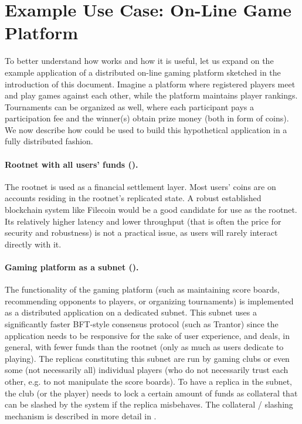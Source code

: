 \section{Example Use Case: On-Line Game Platform}
\label{sec:example-use-case}

To better understand how \ipc works and how it is useful, let us expand on the example application of a distributed on-line gaming platform sketched in the introduction of this document.
Imagine a platform where registered players meet and play games against each other, while the platform maintains player rankings.
Tournaments can be organized as well, where each participant pays a participation fee and the winner(s) obtain prize money (both in form of coins).
We now describe how \ipc could be used to build this hypothetical application in a fully distributed fashion.

\paragraph{Rootnet with all users' funds ().}
The rootnet is used as a financial settlement layer.
Most users' coins are on accounts residing in the rootnet's replicated state.
A robust established blockchain system like Filecoin would be a good candidate for use as the rootnet.
Its relatively higher latency and lower throughput (that is often the price for security and robustness) is not a practical issue,
as users will rarely interact directly with it.

\paragraph{Gaming platform as a subnet ().}
The functionality of the gaming platform
(such as maintaining score boards, recommending opponents to players, or organizing tournaments)
is implemented as a distributed application on a dedicated subnet.
This subnet uses a significantly faster BFT-style consensus protocol (such as Trantor)
since the application needs to be responsive for the sake of user experience,
and deals, in general, with fewer funds than the rootnet (only as much as users dedicate to playing).
The replicas constituting this subnet are run by gaming clubs or even some (not necessarily all) individual players
(who do not necessarily trust each other, e.g. to not manipulate the score boards).
To have a replica in the  subnet, the club (or the player) needs to lock a certain amount of funds as collateral that can be slashed by the system if the replica misbehaves.
The collateral / slashing mechanism is described in more detail in .

